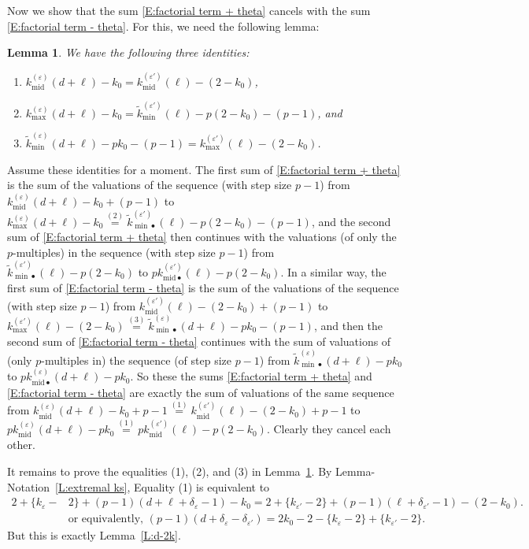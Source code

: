 \documentclass[12pt]{amsart}
\newtheorem{lemma}[subsection]{Lemma}
\theoremstyle{definition}
\numberwithin{equation}{subsection}
\newcommand{\midd}{\mathrm{mid}}
\begin{document}
Now we show that the sum \eqref{E:factorial term + theta} cancels with the sum \eqref{E:factorial term - theta}.
For this, we need the following lemma:
\begin{lemma}\label{L:three elementary identities}
	We have the following three identities:
\begin{enumerate}
\item $k_\midd^{(\varepsilon)} (d+\ell) -k_0 = k_{\midd}^{(\varepsilon')}(\ell) - (2-k_0)$,
\item 
$k_{\max}^{(\varepsilon)} (d+\ell) -k_0 = \tilde  k_{\min}^{(\varepsilon')}(\ell) -p (2-k_0)-(p-1)$, and
\item 
$\tilde k_{\min}^{(\varepsilon)} (d+\ell) -pk_0 - (p-1) =   k_{\max}^{(\varepsilon')}(\ell) - (2-k_0)$.
\end{enumerate}
\end{lemma}
Assume these identities for a moment.
The first sum of \eqref{E:factorial term + theta} is the sum of the  valuations of the sequence (with step size $p-1$) from $ k^{(\varepsilon)}_{\midd}(d+\ell) - k_0+(p-1)$ to $k^{(\varepsilon)}_{\max}(d+\ell) - k_0 \stackrel{(2)}= \tilde k_{{\min}\bullet}^{(\varepsilon')}(\ell) -p(2-k_0) - (p-1)$, and the second sum of \eqref{E:factorial term + theta} then continues with the valuations (of only the $p$-multiples) in the sequence (with step size $p-1$) from $\tilde k_{{\min}\bullet}^{(\varepsilon')}(\ell) -p(2-k_0)$ to $pk_{\midd\bullet}^{(\varepsilon')}(\ell) - p(2-k_0)$.
In a similar way, the first sum of \eqref{E:factorial term - theta} is the sum of the  valuations of the sequence (with step size $p-1$) from $ k^{(\varepsilon')}_{\midd}(\ell) - (2-k_0)+(p-1)$ to $k^{(\varepsilon')}_{\max}(\ell) - (2-k_0) \stackrel{(3)}= \tilde k_{{\min}\bullet}^{(\varepsilon)}(d+\ell) -pk_0-(p-1)$, and then the second sum of \eqref{E:factorial term - theta} continues with the sum of valuations of (only $p$-multiples in) the sequence (of step size $p-1$) from $\tilde k_{{\min}\bullet}^{(\varepsilon)}(d+\ell) -pk_0$ to $pk_{\midd\bullet}^{(\varepsilon)}(d+\ell) - pk_0$.
So these the sums \eqref{E:factorial term + theta} and \eqref{E:factorial term - theta} are exactly the sum of valuations of the same sequence from $k_{\midd}^{(\varepsilon)}(d+\ell) - k_0+p-1 \stackrel{(1)}= k_{\midd}^{(\varepsilon')}(\ell) - (2-k_0)+p-1$ to $pk_{\midd}^{(\varepsilon)}(d+\ell) - pk_0 \stackrel{(1)}= pk_{\midd}^{(\varepsilon')}(\ell) -p (2-k_0)$. Clearly they cancel each other.

\medskip
It remains to prove the equalities (1), (2), and (3) in Lemma~\ref{L:three elementary identities}.
By Lemma-Notation~\ref{L:extremal ks}, Equality (1) is equivalent to
\begin{align*}
2+\{k_\varepsilon -&2\} + (p-1)(d+\ell +\delta_\varepsilon -1) -k_0 = 2+\{k_{\varepsilon '}-2\} + (p-1)(\ell + \delta_{\varepsilon'} -1) - (2-k_0).
\\
&
\textrm{or equivalently, }(p-1)(d+\delta_\varepsilon - \delta_{\varepsilon'}) = 2k_0 -2 -\{k_\varepsilon-2\}+\{k_{\varepsilon'}-2\}.
\end{align*}
But this is exactly Lemma~\ref{L:d-2k}.
\end{document}
